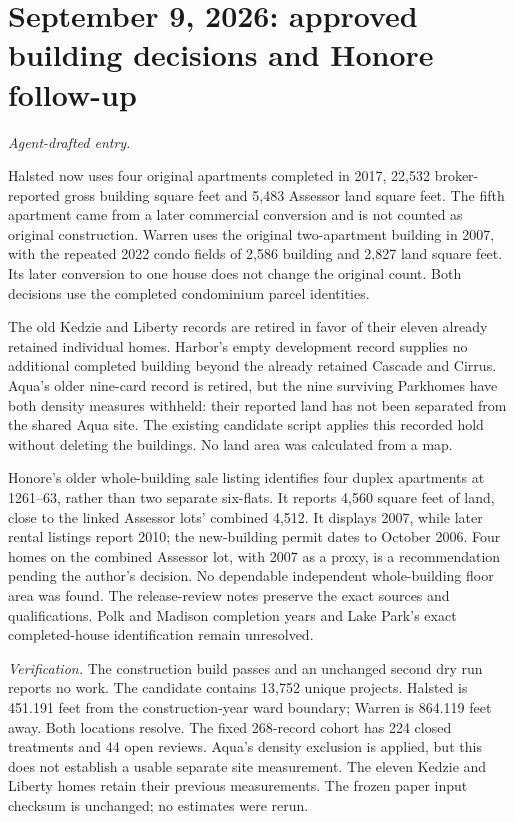 \clearpage
\section*{September 9, 2026: approved building decisions and Honore follow-up}
\textit{Agent-drafted entry.}

Halsted now uses four original apartments completed in 2017, 22,532 broker-reported gross building square feet and 5,483 Assessor land square feet. The fifth apartment came from a later commercial conversion and is not counted as original construction. Warren uses the original two-apartment building in 2007, with the repeated 2022 condo fields of 2,586 building and 2,827 land square feet. Its later conversion to one house does not change the original count. Both decisions use the completed condominium parcel identities.

The old Kedzie and Liberty records are retired in favor of their eleven already retained individual homes. Harbor's empty development record supplies no additional completed building beyond the already retained Cascade and Cirrus. Aqua's older nine-card record is retired, but the nine surviving Parkhomes have both density measures withheld: their reported land has not been separated from the shared Aqua site. The existing candidate script applies this recorded hold without deleting the buildings. No land area was calculated from a map.

Honore's older whole-building sale listing identifies four duplex apartments at 1261--63, rather than two separate six-flats. It reports 4,560 square feet of land, close to the linked Assessor lots' combined 4,512. It displays 2007, while later rental listings report 2010; the new-building permit dates to October 2006. Four homes on the combined Assessor lot, with 2007 as a proxy, is a recommendation pending the author's decision. No dependable independent whole-building floor area was found. The release-review notes preserve the exact sources and qualifications. Polk and Madison completion years and Lake Park's exact completed-house identification remain unresolved.

\medskip
\noindent\textit{Verification.} The construction build passes and an unchanged second dry run reports no work. The candidate contains 13,752 unique projects. Halsted is 451.191 feet from the construction-year ward boundary; Warren is 864.119 feet away. Both locations resolve. The fixed 268-record cohort has 224 closed treatments and 44 open reviews. Aqua's density exclusion is applied, but this does not establish a usable separate site measurement. The eleven Kedzie and Liberty homes retain their previous measurements. The frozen paper input checksum is unchanged; no estimates were rerun.
